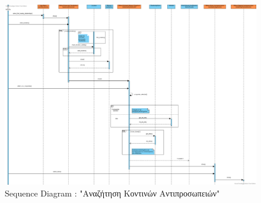\documentclass{../ol-softwaremanual}
\begin{document}
	
	\begin{figure}[htbp!]
		\centering
		\includegraphics[scale=0.215]{img/seq_search_nearby_dealerships.png}
		\caption{\en Sequence Diagram : "\gr Αναζήτηση Κοντινών Αντιπροσωπειών\en"\gr}
	\end{figure}
	
	\newpage
	
	\centering
	
\end{document}
